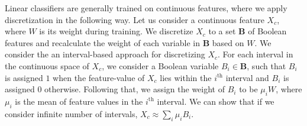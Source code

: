 Linear classifiers are generally trained on continuous features, where we apply discretization in the following way. Let us consider a continuous feature $X_c$, where $W$ is its weight during training. We discretize $ X_c $ to a set $ \mathbf{B} $ of Boolean features and recalculate the weight of each variable in $ \mathbf{B} $ based on $ W $. We consider the an interval-based approach for discretizing $ X_c $. For each interval in the continuous space of $X_c$, we consider a Boolean variable $B_i \in \mathbf{B}$, such that $ B_i $ is assigned $ 1 $ when the feature-value of $X_c$ lies within the $i^{\mathrm{th}}$ interval and $ B_i $ is assigned $ 0 $ otherwise. Following that, we assign the weight of $ B_i $ to be $ \mu_iW $, where $ \mu_i $ is the mean of feature values in the $i^{\mathrm{th}}$ interval. We can show that if we consider infinite number of intervals, $ X_c \approx \sum_i \mu_i B_i $. 



